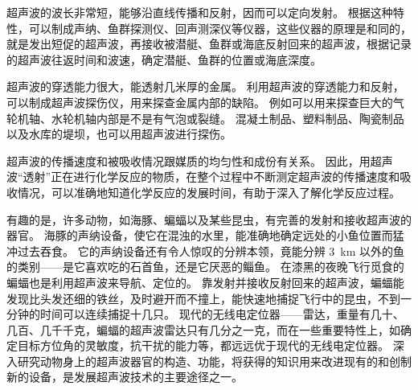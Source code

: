 超声波的波长非常短，能够沿直线传播和反射，因而可以定向发射。
根据这种特性，可以制成声纳、鱼群探测仪、回声测深仪等仪器，这些仪器的原理是和同的，就是发出短促的超声波，再接收被潜艇、鱼群或海底反射回来的超声波，根据记录的超声波往返时间和波速，确定潜艇、鱼群的位置或海底深度。

超声波的穿透能力很大，能透射几米厚的金属。
利用超声波的穿透能力和反射，可以制成超声波探伤仪，用来探查金属内部的缺陷。
例如可以用来探查巨大的气轮机轴、水轮机轴内部是不是有气泡或裂缝。
混凝土制品、塑料制品、陶瓷制品以及水库的堤坝，也可以用超声波进行探伤。

超声波的传播速度和被吸收情况跟媒质的均匀性和成份有关系。
因此，用超声波“透射”正在进行化学反应的物质，在整个过程中不断测定超声波的传播速度和吸收情况，可以准确地知道化学反应的发展时间，有助于深入了解化学反应过程。

有趣的是，许多动物，如海豚、蝙蝠以及某些昆虫，有完善的发射和接收超声波的器官。
海豚的声纳设备，使它在混浊的水里，能准确地确定远处的小鱼位置而猛冲过去吞食。
它的声纳设备还有令人惊叹的分辨本领，竟能分辨 \qty{3}{km} 以外的鱼的类别——是它喜欢吃的石首鱼，还是它厌恶的鲻鱼。
在漆黑的夜晚飞行觅食的蝙蝠也是利用超声波来导航、定位的。
靠发射并接收反射回来的超声波，蝙蝠能发现比头发还细的铁丝，及时避开而不撞上，能快速地捕捉飞行中的昆虫，不到一分钟的时间可以连续捕捉十几只。
现代的无线电定位器——雷达，重量有几十、几百、几千千克，蝙蝠的超声波雷达只有几分之一克，而在一些重要特性上，如确定目标方位角的灵敏度，抗干扰的能力等，都远远优于现代的无线电定位器。
深入研究动物身上的超声波器官的构造、功能，将获得的知识用来改进现有的和创制新的设备，是发展超声波技术的主要途径之一。

